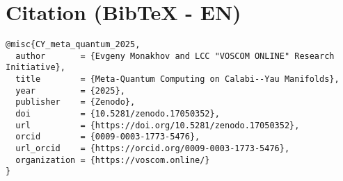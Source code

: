\documentclass[12pt,a4paper]{article}
\begin{document}
\section*{Citation (BibTeX - EN)}
\begin{verbatim}
@misc{CY_meta_quantum_2025,
  author       = {Evgeny Monakhov and LCC "VOSCOM ONLINE" Research Initiative},
  title        = {Meta-Quantum Computing on Calabi--Yau Manifolds},
  year         = {2025},
  publisher    = {Zenodo},
  doi          = {10.5281/zenodo.17050352},
  url          = {https://doi.org/10.5281/zenodo.17050352},
  orcid        = {0009-0003-1773-5476},
  url_orcid    = {https://orcid.org/0009-0003-1773-5476},
  organization = {https://voscom.online/}
}
\end{verbatim}
\end{document}

